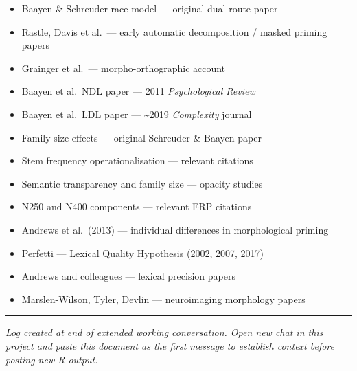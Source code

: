 \documentclass[11pt, a4paper]{article}
\begin{document}
\begin{itemize}[leftmargin=1.5em]
  \item Baayen \& Schreuder race model — original dual-route paper
  \item Rastle, Davis et al.\ — early automatic decomposition / masked priming papers
  \item Grainger et al.\ — morpho-orthographic account
  \item Baayen et al.\ NDL paper — 2011 \textit{Psychological Review}
  \item Baayen et al.\ LDL paper — \textasciitilde2019 \textit{Complexity} journal
  \item Family size effects — original Schreuder \& Baayen paper
  \item Stem frequency operationalisation — relevant citations
  \item Semantic transparency and family size — opacity studies
  \item N250 and N400 components — relevant ERP citations
  \item Andrews et al.\ (2013) — individual differences in morphological priming
  \item Perfetti — Lexical Quality Hypothesis (2002, 2007, 2017)
  \item Andrews and colleagues — lexical precision papers
  \item Marslen-Wilson, Tyler, Devlin — neuroimaging morphology papers
\end{itemize}

\bigskip
\hrule
\smallskip
{\small \textit{Log created at end of extended working conversation. Open new chat in this project and paste this document as the first message to establish context before posting new R output.}}
\end{document}
